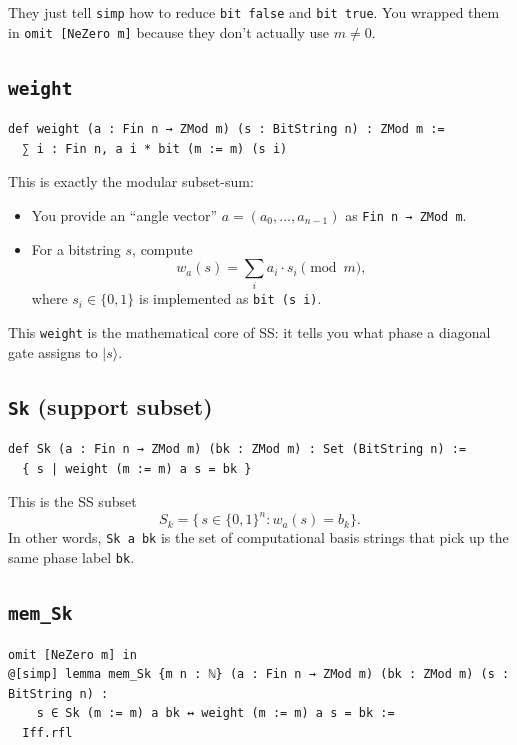 \documentclass[11pt]{article}
\newcommand{\ket}[1]{\lvert #1 \rangle}
\begin{document}
They just tell \texttt{simp} how to reduce \texttt{bit false} and \texttt{bit true}.
You wrapped them in \texttt{omit [NeZero m]} because they don't actually use $m\neq 0$.

\subsection*{\texttt{weight}}

\begin{lstlisting}
def weight (a : Fin n → ZMod m) (s : BitString n) : ZMod m :=
  ∑ i : Fin n, a i * bit (m := m) (s i)
\end{lstlisting}

This is exactly the modular subset-sum:
\begin{itemize}
\item You provide an ``angle vector'' $a=(a_0,\dots,a_{n-1})$ as \texttt{Fin n → ZMod m}.
\item For a bitstring $s$, compute
\[
w_a(s)=\sum_i a_i\cdot s_i \pmod m,
\]
where $s_i\in\{0,1\}$ is implemented as \texttt{bit (s i)}.
\end{itemize}

This \texttt{weight} is the mathematical core of SS: it tells you what phase a diagonal gate assigns to $\ket{s}$.

\subsection*{\texttt{Sk} (support subset)}

\begin{lstlisting}
def Sk (a : Fin n → ZMod m) (bk : ZMod m) : Set (BitString n) :=
  { s | weight (m := m) a s = bk }
\end{lstlisting}

This is the SS subset
\[
S_k=\{\, s\in\{0,1\}^n : w_a(s)=b_k \}.
\]
In other words, \texttt{Sk a bk} is the set of computational basis strings that pick up the same phase label \texttt{bk}.

\subsection*{\texttt{mem\_Sk}}

\begin{lstlisting}
omit [NeZero m] in
@[simp] lemma mem_Sk {m n : ℕ} (a : Fin n → ZMod m) (bk : ZMod m) (s : BitString n) :
    s ∈ Sk (m := m) a bk ↔ weight (m := m) a s = bk :=
  Iff.rfl
\end{lstlisting}
\end{document}
